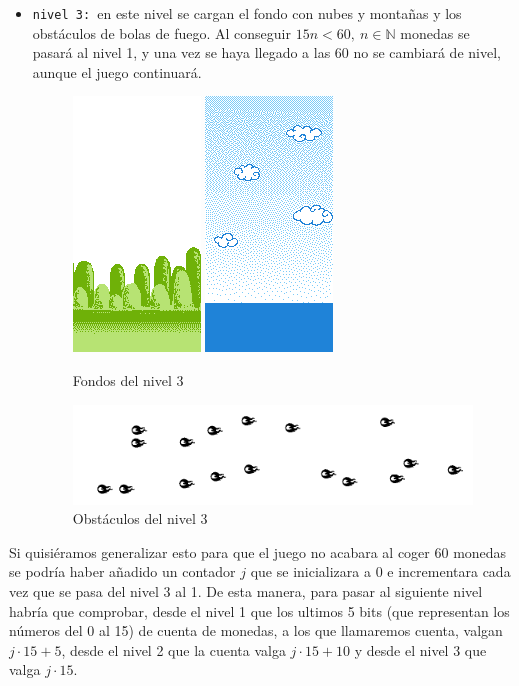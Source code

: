 \documentclass[11pt, a4paper, spanish, openright, twoside]{book}
\begin{document}
\begin{itemize}
\item \texttt{nivel 3: }en este nivel se cargan el fondo con nubes y montañas y los obstáculos de bolas de fuego. Al conseguir $15n<60,\ n\in\mathbb{N}$ monedas se pasará al nivel 1, y una vez se haya llegado a las 60 no se cambiará de nivel, aunque el juego continuará. 

	\begin{figure}[!h]
		\centering
		\includegraphics[scale=0.75]{arboles.png}
		\includegraphics[scale=0.75]{nubes.png}	
		\caption{Fondos del nivel 3}
	\end{figure}

	\begin{figure}[!h]
		\centering
		\includegraphics[scale=0.45]{nivelfuegoBW.png}
		\caption{Obstáculos del nivel 3}
	\end{figure}

\end{itemize}
Si quisiéramos generalizar esto para que el juego no acabara al coger 60 monedas se podría haber añadido un contador $j$ que se inicializara a 0 e incrementara cada vez que se pasa del nivel 3 al 1. De esta manera, para pasar al siguiente nivel habría que comprobar, desde el nivel 1 que los ultimos 5 bits (que representan los números del 0 al 15) de cuenta de monedas, a los que llamaremos cuenta, valgan $j\cdot 15 + 5$, desde el nivel 2 que la cuenta  valga $j\cdot 15 + 10$ y desde el nivel 3 que valga $j\cdot 15$. 
\end{document}
